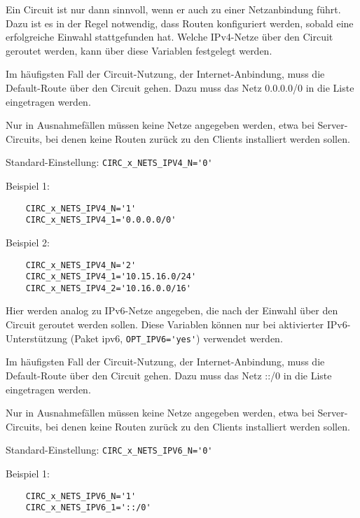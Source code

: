 \begin{description}
Ein Circuit ist nur dann sinnvoll, wenn er auch zu einer Netzanbindung führt.
Dazu ist es in der Regel notwendig, dass Routen konfiguriert werden, sobald
eine erfolgreiche Einwahl stattgefunden hat. Welche IPv4-Netze über den Circuit
geroutet werden, kann über diese Variablen festgelegt werden.

Im häufigsten Fall der Circuit-Nutzung, der Internet-Anbindung, muss die
Default-Route über den Circuit gehen. Dazu muss das Netz 0.0.0.0/0 in die Liste
eingetragen werden.

Nur in Ausnahmefällen müssen keine Netze angegeben werden, etwa bei
Server-Circuits, bei denen keine Routen zurück zu den Clients installiert werden
sollen.

Standard-Einstellung: \verb+CIRC_x_NETS_IPV4_N='0'+

Beispiel 1:
\begin{example}
\begin{verbatim}
    CIRC_x_NETS_IPV4_N='1'
    CIRC_x_NETS_IPV4_1='0.0.0.0/0'
\end{verbatim}
\end{example}

Beispiel 2:
\begin{example}
\begin{verbatim}
    CIRC_x_NETS_IPV4_N='2'
    CIRC_x_NETS_IPV4_1='10.15.16.0/24'
    CIRC_x_NETS_IPV4_2='10.16.0.0/16'
\end{verbatim}
\end{example}


Hier werden analog zu  IPv6-Netze angegeben, die
nach der Einwahl über den Circuit geroutet werden sollen. Diese Variablen können
nur bei aktivierter IPv6-Unterstützung (Paket ipv6, \verb+OPT_IPV6='yes'+)
verwendet werden.

Im häufigsten Fall der Circuit-Nutzung, der Internet-Anbindung, muss die
Default-Route über den Circuit gehen. Dazu muss das Netz ::/0 in die Liste
eingetragen werden.

Nur in Ausnahmefällen müssen keine Netze angegeben werden, etwa bei
Server-Circuits, bei denen keine Routen zurück zu den Clients installiert werden
sollen.

Standard-Einstellung: \verb+CIRC_x_NETS_IPV6_N='0'+

Beispiel 1:
\begin{example}
\begin{verbatim}
    CIRC_x_NETS_IPV6_N='1'
    CIRC_x_NETS_IPV6_1='::/0'
\end{verbatim}
\end{example}


\end{description}

